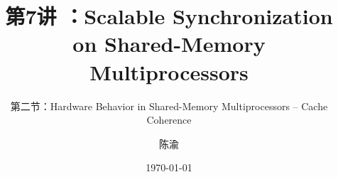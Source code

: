 


\title[第7讲]{第7讲 ：Scalable Synchronization on Shared-Memory Multiprocessors} %
\subtitle{第二节：Hardware Behavior in Shared-Memory Multiprocessors -- Cache Coherence}
\author{陈渝} %
\date{\today} %




\begin{frame}
\titlepage %
\end{frame}


